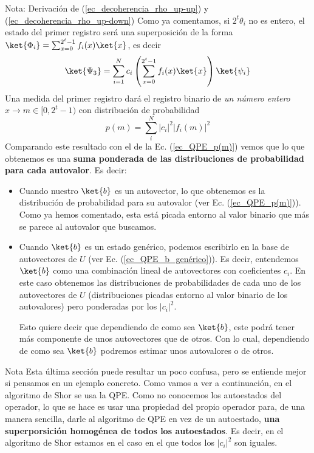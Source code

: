 \documentclass[a4paper,11pt]{book} %
\numberwithin{equation}{chapter}
\def\lp{\left(}
\def\rp{\right)}
\begin{document}
\begin{mybox_blue}{Nota: Derivación de (\ref{ec_decoherencia_rho_up-up}) y  (\ref{ec_decoherencia_rho_up-down})}
Como ya comentamos, si $2^t \theta_i$ no es entero, el estado del primer registro será una superposición de la forma $\ket{\Phi_i} = \sum_{x=0}^{2^t-1} f_i(x) \ket{x}$, es decir
	\begin{equation} \label{ec_QPE_Psi_3_ci}
	\ket{\Psi_3}  = \sum_{i=1}^N  c_i \lp \sum_{x=0}^{2^t-1} f_i(x) \ket{x} \rp  \ket{\psi_i} \\ \rule{0mm}{7mm}
	\end{equation}
Una medida del primer registro dará el registro binario de \textit{un número entero} $x \to m \in [0,2^t-1)$ con distribución de probabilidad 
	\begin{equation} \label{ec_QPE_p(m)_ci}
	p(m) = \sum_i^N |c_i|^2 |f_i(m)|^2
	\end{equation}		
Comparando este resultado con el de la Ec. (\ref{ec_QPE_p(m)}) vemos que lo que obtenemos es una \textbf{suma ponderada de las distribuciones de probabilidad para cada autovalor}. Es decir:
\begin{itemize}
	\item Cuando nuestro $\ket{b}$ es un autovector, lo que obtenemos es la distribución de probabilidad para su autovalor (ver Ec. (\ref{ec_QPE_p(m)})). Como ya hemos comentado, esta está picada entorno al valor binario que más se parece al autovalor que buscamos.
	
	\item Cuando $\ket{b}$ es un estado genérico, podemos escribirlo en la base de autovectores de $U$ (ver Ec. (\ref{ec_QPE_b_genérico})). Es decir, entendemos $\ket{b}$ como una combinación lineal de autovectores con coeficientes $c_i$. En este caso obtenemos las distribuciones de probabilidades de cada uno de los autovectores de $U$ (distribuciones picadas entorno al valor binario de los autovalores) pero ponderadas por los $|c_i|^2$. 
	
	Esto quiere decir que dependiendo de como sea $\ket{b}$, este podrá tener más componente de unos autovectores que de otros. Con lo cual, dependiendo de como sea $\ket{b}$ podremos estimar unos autovalores o de otros.
\end{itemize}

	\begin{mybox_blue}{Nota}
	Esta última sección puede resultar un poco confusa, pero se entiende mejor si pensamos en un ejemplo concreto. Como vamos a ver a continuación, en el algoritmo de Shor se usa la QPE. Como no conocemos los autoestados del operador, lo que se hace es usar una propiedad del propio operador para, de una manera sencilla, darle al algoritmo de QPE en vez de un autoestado, \textbf{una superporsición homogénea de todos los autoestados}. Es decir, en el algoritmo de Shor estamos en el caso en el que todos los $|c_i|^2$ son iguales. 
	\vspace{0.3cm}
	

\end{mybox_blue}
\end{mybox_blue}
\end{document}
